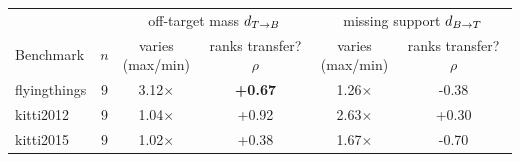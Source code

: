 \begin{tabular}{l c cc cc}
\toprule
 & & \multicolumn{2}{c}{off-target mass $d_{T\to B}$} & \multicolumn{2}{c}{missing support $d_{B\to T}$} \\
\cmidrule(lr){3-4}\cmidrule(lr){5-6}
Benchmark & $n$ & \makecell{varies\\(max/min)} & \makecell{ranks transfer?\\$\rho$} & \makecell{varies\\(max/min)} & \makecell{ranks transfer?\\$\rho$} \\
\midrule
flyingthings & 9 & 3.12$\times$ & \textbf{+0.67} & 1.26$\times$ & -0.38 \\
kitti2012 & 9 & 1.04$\times$ & +0.92 & 2.63$\times$ & +0.30 \\
kitti2015 & 9 & 1.02$\times$ & +0.38 & 1.67$\times$ & -0.70 \\
\bottomrule
\end{tabular}
